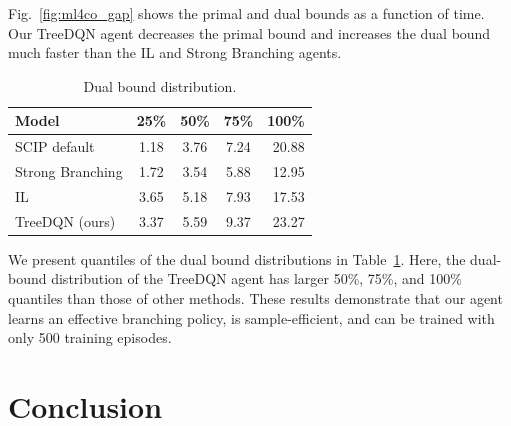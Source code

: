 \documentclass[preprint,12pt]{elsarticle} %
\theoremstyle{plain}
\theoremstyle{definition}
\theoremstyle{remark}
\begin{document}
Fig.~\ref{fig:ml4co_gap} shows the primal and dual bounds as a function of time. Our TreeDQN agent decreases the primal bound and increases the dual bound much faster than the IL and Strong Branching agents.


\begin{table}[t]
\caption{Dual bound distribution.}\label{tab:ml4co_wr}
\begin{center}
\footnotesize
    \begin{tabular}{lcccr}
         \hline
         Model & 25\% & 50\% & 75\% & 100\% \\
         \hline
         SCIP default & 1.18 &  3.76 &  7.24 &  20.88 \\
         Strong Branching & 1.72 &  3.54 &  5.88 &  12.95 \\
         IL & 3.65 &  5.18 &  7.93 &  17.53 \\
         \hline
         TreeDQN (ours) &  3.37 &  5.59 &  9.37 &  23.27 \\
         \hline
    \end{tabular}
    
\end{center}
\end{table}

We present quantiles of the dual bound distributions in Table~\ref{tab:ml4co_wr}. Here, the dual-bound distribution of the TreeDQN agent has larger 50\%, 75\%, and 100\% quantiles than those of other methods. 
These results demonstrate that our agent learns an effective branching policy, is sample-efficient, and can be trained with only 500 training episodes. 


\section{Conclusion}\label{sec:conclusion}
\end{document}
